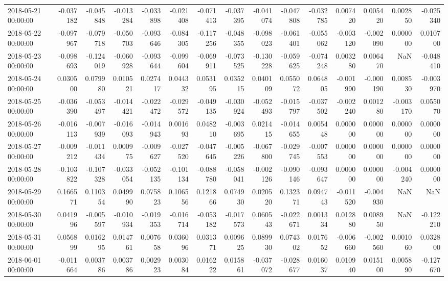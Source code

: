\begin{tabular}{lrrrrrrrrrrrrrr}
2018-05-21 00:00:00 & -0.037182 & -0.045848 & -0.013284 & -0.033898 & -0.021408 & -0.071413 & -0.037395 & -0.041074 & -0.047808 & -0.032785 & 0.007420 & 0.005420 & 0.002850 & -0.025340 \\
2018-05-22 00:00:00 & -0.097967 & -0.079718 & -0.050703 & -0.093646 & -0.084305 & -0.117256 & -0.048355 & -0.098023 & -0.061401 & -0.055062 & -0.003120 & -0.002090 & 0.000000 & 0.010700 \\
2018-05-23 00:00:00 & -0.098693 & -0.124019 & -0.060928 & -0.093644 & -0.099604 & -0.069911 & -0.073525 & -0.130228 & -0.059625 & -0.074248 & 0.003280 & 0.006470 & NaN & -0.048410 \\
2018-05-24 00:00:00 & 0.030500 & 0.079980 & 0.010521 & 0.027417 & 0.044332 & 0.053195 & 0.035215 & 0.040109 & 0.055072 & 0.064805 & -0.001990 & -0.000190 & 0.008530 & -0.003970 \\
2018-05-25 00:00:00 & -0.036390 & -0.053497 & -0.014421 & -0.022472 & -0.029572 & -0.049135 & -0.030924 & -0.052493 & -0.015797 & -0.037502 & -0.002240 & 0.001280 & -0.003170 & 0.055070 \\
2018-05-26 00:00:00 & -0.016113 & -0.007939 & -0.016093 & -0.014943 & 0.001693 & 0.048210 & -0.003695 & 0.021415 & -0.014655 & 0.005448 & 0.000000 & 0.000000 & 0.000000 & 0.000000 \\
2018-05-27 00:00:00 & -0.009212 & -0.011434 & 0.000975 & -0.009627 & -0.027520 & -0.047645 & -0.005226 & -0.067800 & -0.029745 & -0.007553 & 0.000000 & 0.000000 & 0.000000 & 0.000000 \\
2018-05-28 00:00:00 & -0.103822 & -0.107328 & -0.033054 & -0.052135 & -0.101134 & -0.088780 & -0.058041 & -0.002126 & -0.090146 & -0.093647 & 0.000000 & 0.000000 & -0.004240 & 0.000000 \\
2018-05-29 00:00:00 & 0.166571 & 0.110354 & 0.049990 & 0.075823 & 0.106556 & 0.121866 & 0.074930 & 0.020520 & 0.132371 & 0.094743 & -0.011520 & -0.004930 & NaN & NaN \\
2018-05-30 00:00:00 & 0.041996 & -0.005597 & -0.010934 & -0.019353 & -0.016714 & -0.053182 & -0.017573 & 0.060543 & -0.022671 & 0.001334 & 0.012880 & 0.008950 & NaN & -0.122210 \\
2018-05-31 00:00:00 & 0.056899 & 0.016295 & 0.014761 & 0.007658 & 0.036096 & 0.031371 & 0.009625 & 0.089930 & 0.074302 & 0.017652 & -0.006660 & -0.002560 & 0.001060 & 0.032800 \\
2018-06-01 00:00:00 & -0.011664 & 0.003786 & 0.003786 & 0.002923 & 0.003084 & 0.016222 & 0.015861 & -0.037072 & -0.028677 & 0.016037 & 0.010940 & 0.015100 & 0.005890 & -0.127670 \\

\end{tabular}
